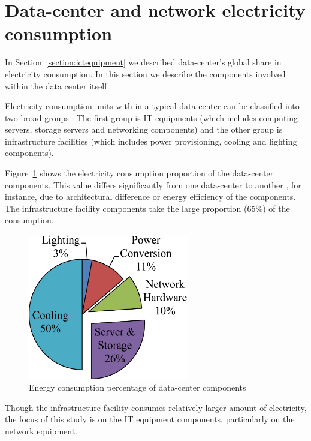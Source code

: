 \section {Data-center and network electricity consumption}
\label{section:datacenter} 
In Section~\ref{section:ictequipment} we described data-center's global share in electricity consumption. In this section we describe the components involved within the data center itself.

Electricity consumption units with in a typical data-center can be classified into two broad groups \cite{DBLP:journals/comsur/DayarathnaWF16}: The first group is IT equipments (which includes computing servers, storage servers and networking components) and the other group is infrastructure facilities (which includes power provisioning, cooling and lighting components).

Figure~\ref{fig:datacenterenergy} \cite{DBLP:journals/comsur/DayarathnaWF16} shows the electricity consumption proportion of the data-center components. This value differs significantly from one data-center to another \cite{DBLP:series/synthesis/2013Barroso}, for instance, due to architectural difference\cite{DBLP:conf/eenergy/GyarmatiT10} or energy efficiency of the components. The infrastructure facility components take the large proportion (65\%) of the consumption. 
\begin{figure}[ht]
	\begin{center}
		\includegraphics[width=7cm]{images/datacenterenergy.pdf}
		\caption{Energy consumption percentage of data-center components \cite{DBLP:journals/comsur/DayarathnaWF16}}
		\label{fig:datacenterenergy}
	\end{center}
\end{figure}
Though the infrastructure facility consumes relatively larger amount of electricity, the focus of this study is on the IT equipment components, particularly on the network equipment. 

